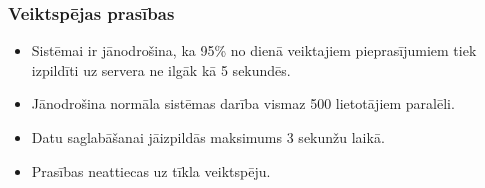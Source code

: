 \subsubsection{Veiktspējas prasības}
\begin{itemize}
	\item Sistēmai ir jānodrošina, ka 95\% no dienā veiktajiem pieprasījumiem tiek izpildīti uz servera ne ilgāk kā 5 sekundēs.
	\item Jānodrošina normāla sistēmas darība vismaz 500 lietotājiem paralēli.
	\item Datu saglabāšanai jāizpildās maksimums 3 sekunžu laikā.
	\item Prasības neattiecas uz tīkla veiktspēju.
\end{itemize}
